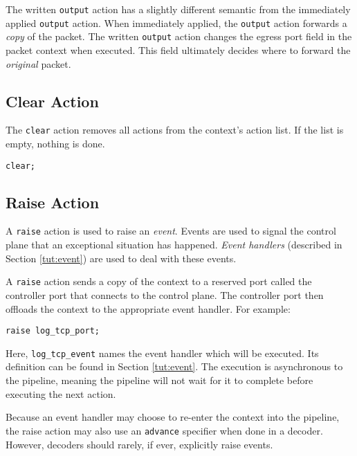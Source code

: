 The written \texttt{output} action has a slightly different semantic from the immediately
applied \texttt{output} action. When immediately applied, the \texttt{output} action forwards a
\textit{copy} of the packet. The written \texttt{output} action changes the egress port field
in the packet context when executed. This field ultimately decides where to forward the
\textit{original} packet.

\subsection{Clear Action} \label{tut:clear_action}

The \texttt{clear} action removes all actions from the context's action list. If the list is empty, nothing is done.

\begin{codepage}
\begin{lstlisting}
clear;
\end{lstlisting}
\end{codepage}

\subsection{Raise Action} \label{tut:raise_action}

A \texttt{raise} action is used to raise an \textit{event}. Events are used to
signal the control plane that an exceptional situation has happened.
\textit{Event handlers} (described in Section \ref{tut:event}) are used to
deal with these events.

A \texttt{raise} action sends a copy of the context to a reserved port called the controller port that connects to the control plane.
The controller port then offloads the context to the appropriate event handler.
For example:

\begin{codepage}
\begin{lstlisting}
raise log_tcp_port;
\end{lstlisting}
\end{codepage}


Here, \texttt{log\_tcp\_event} names the event handler which will be executed. Its definition can be found in Section \ref{tut:event}. The execution is asynchronous to the pipeline, meaning the pipeline will not wait for it to complete before executing the next action.

Because an event handler may choose to re-enter the context into the pipeline, the raise action may also use an \texttt{advance} specifier when done in a decoder. However, decoders should rarely, if ever, explicitly raise events.

